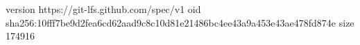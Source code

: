version https://git-lfs.github.com/spec/v1
oid sha256:10fff7be9d2fea6cd62aad9c8c10d81e21486bc4ee43a9a453e43ae478fd874e
size 174916
